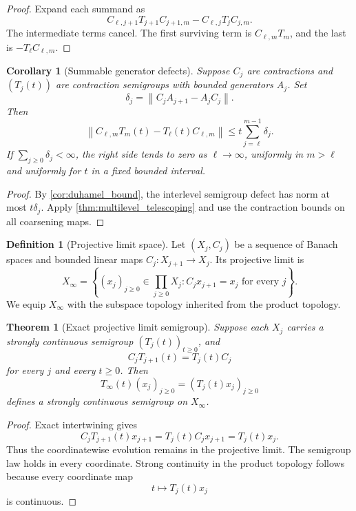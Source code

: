 \documentclass{aomart}
\newtheorem{theorem}{Theorem}[section]
\newtheorem{corollary}[corollary]{Corollary}
\theoremstyle{definition}
\newtheorem{definition}[definition]{Definition}
\theoremstyle{remark}
\newcommand{\norm}[1]{\left\lVert#1\right\rVert}
\begin{document}
\begin{proof}
Expand each summand as
\[
C_{\ell,j+1}T_{j+1}C_{j+1,m}
-
C_{\ell,j}T_jC_{j,m}.
\]
The intermediate terms cancel. The first surviving term is \(C_{\ell,m}T_m\), and the last is \(-T_\ell C_{\ell,m}\).
\end{proof}

\begin{corollary}[Summable generator defects]\label{cor:summable_defects}
Suppose \(C_j\) are contractions and \((T_j(t))\) are contraction semigroups with bounded generators \(A_j\). Set
\[
\delta_j=\norm{C_jA_{j+1}-A_jC_j}.
\]
Then
\[
\norm{C_{\ell,m}T_m(t)-T_\ell(t)C_{\ell,m}}
\leq
 t\sum_{j=\ell}^{m-1}\delta_j.
\]
If \(\sum_{j\geq0}\delta_j<\infty\), the right side tends to zero as \(\ell\to\infty\), uniformly in \(m>\ell\) and uniformly for \(t\) in a fixed bounded interval.
\end{corollary}

\begin{proof}
By \cref{cor:duhamel_bound}, the interlevel semigroup defect has norm at most \(t\delta_j\). Apply \cref{thm:multilevel_telescoping} and use the contraction bounds on all coarsening maps.
\end{proof}

\begin{definition}[Projective limit space]\label{def:projective_limit}
Let \((X_j,C_j)\) be a sequence of Banach spaces and bounded linear maps \(C_j:X_{j+1}\to X_j\). Its projective limit is
\[
X_\infty
=
\left\{
(x_j)_{j\geq0}\in\prod_{j\geq0}X_j:
C_jx_{j+1}=x_j\text{ for every }j
\right\}.
\]
We equip \(X_\infty\) with the subspace topology inherited from the product topology.
\end{definition}

\begin{theorem}[Exact projective limit semigroup]\label{thm:projective_limit_semigroup}
Suppose each \(X_j\) carries a strongly continuous semigroup \((T_j(t))_{t\geq0}\), and
\[
C_jT_{j+1}(t)=T_j(t)C_j
\]
for every \(j\) and every \(t\geq0\). Then
\[
T_\infty(t)(x_j)_{j\geq0}
=
(T_j(t)x_j)_{j\geq0}
\]
defines a strongly continuous semigroup on \(X_\infty\).
\end{theorem}

\begin{proof}
Exact intertwining gives
\[
C_jT_{j+1}(t)x_{j+1}
=
T_j(t)C_jx_{j+1}
=
T_j(t)x_j.
\]
Thus the coordinatewise evolution remains in the projective limit. The semigroup law holds in every coordinate. Strong continuity in the product topology follows because every coordinate map
\[
t\longmapsto T_j(t)x_j
\]
is continuous.
\end{proof}
\end{document}

